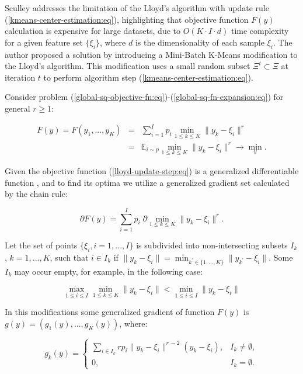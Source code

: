 Sculley \cite{Sculley_2010} addresses the limitation of the Lloyd's algorithm with update rule (\ref{kmeans-center-estimation:eq}), highlighting that objective function $ F(y) $ calculation is expensive for large datasets, due to $ O(K \cdot I \cdot d) $ time complexity for a given feature set $ \{ \xi_i \} $, where $ d $ is the dimensionality of each sample $ \xi_i $. The author proposed a solution by introducing a Mini-Batch K-Means modification to the Lloyd's algorithm. This modification uses a small random subset $\Xi^{t}\subset \Xi$ at iteration $t$ to perform algorithm step (\ref{kmeans-center-estimation:eq}).

Consider problem (\ref{global-sq-objective-fn:eq})-(\ref{global-sq-fn-expansion:eq}) for general $ r\geq 1 $:

\begin{eqnarray}
    \label{lloyd-update-step:eq}
        F(y) = F(y_1, ..., y_K) &=& \sum_{i=1}^I p_i \min_{1 \leq k \leq K} \| y_k - \xi_i \|^r \nonumber \\
        &=& \mathbb{E}_{i \sim p} \min_{1 \leq k \leq K} \| y_k - \xi_i \|^r \rightarrow \min_y.
\end{eqnarray}

Given the objective function (\ref{lloyd-update-step:eq}) is a generalized differentiable function \cite{Norkin_1986}, and to find its optima we utilize a generalized gradient set  calculated by the chain rule:

\begin{equation}
    \label{lloyd-grad-set:eq}
        \partial F(y) = \sum_{i=1}^I p_i \; \partial \min_{1 \leq k \leq K} \| y_k - \xi_i \|^r. 
\end{equation}

Let the set of points $ \{ \xi_i, i = 1, ..., I \} $ is subdivided into non-intersecting subsets $ I_k $, $ k = 1, ..., K $,  such that $ i \in I_k $ if $ \| y_k - \xi_i \| = \min_{k^\prime \in \{ 1, ..., K \}} \| y_{k^\prime} - \xi_i \| $.  Some $ I_k $ may occur empty, for example, in the following case:

\begin{equation}
    \label{lloyd-empty-set-cond:eq}
    \max_{1 \leq i \leq I} \min_{1 \leq k \leq K} \|y_k - \xi_i\| < \min_{1 \leq i \leq I} \|y_k - \xi_i\|
\end{equation}

In this modifications some generalized gradient of function $F(y)$ is $ g(y) = (g_1(y), ..., g_K(y)) $, where:

\begin{equation}
    \label{lloyd-gen-grad-component:eq}
    g_k(y) = \begin{cases}
        \sum_{i \in I_k} r p_i \|y_{k} - \xi_i\|^{r\,-2}(y_{k} - \xi_i), & I_k \neq \emptyset, \\
        0, & I_k = \emptyset. 
    \end{cases}
\end{equation}

